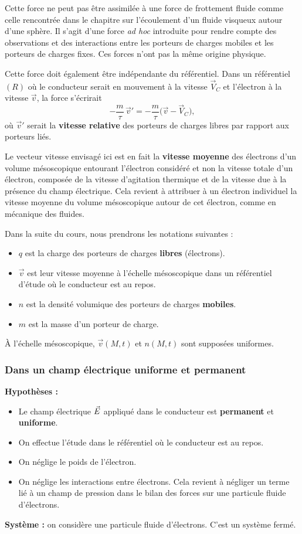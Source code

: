 \documentclass[11pt,a4paper]{article}
\newcommand{\vv}{\vec v}
\begin{document}
Cette force ne peut pas être assimilée à une force de frottement fluide comme celle rencontrée
dans le chapitre sur l'écoulement d'un fluide visqueux autour d'une sphère. Il s'agit d'une
force \emph{ad hoc} introduite pour rendre compte des observations et des interactions entre
les porteurs de charges mobiles et les porteurs de charges fixes. Ces forces n'ont pas la même
origine physique.

Cette force doit également être indépendante du référentiel. Dans un référentiel \((R)\) où le
conducteur serait en mouvement à la vitesse \(\vec V_C\) et l'électron à la vitesse \(\vv\),
la force s'écrirait
\[
 -\frac{m}{\tau}\,\vv'=-\frac{m}{\tau}\bigl(\vv-\vec V_C\bigr),
\]
où \(\vv'\) serait la \textbf{vitesse relative} des porteurs de charges libres par rapport aux porteurs liés.

Le vecteur vitesse envisagé ici est en fait la \textbf{vitesse moyenne} des électrons d'un volume
mésoscopique entourant l'électron considéré et non la vitesse totale d'un électron, composée de la
vitesse d'agitation thermique et de la vitesse due à la présence du champ électrique. Cela revient
à attribuer à un électron individuel la vitesse moyenne du volume mésoscopique autour de cet
électron, comme en mécanique des fluides.

Dans la suite du cours, nous prendrons les notations suivantes :
\begin{itemize}
\item \(q\) est la charge des porteurs de charges \textbf{libres} (électrons).
\item \(\vv\) est leur vitesse moyenne à l'échelle mésoscopique dans un référentiel d'étude
où le conducteur est au repos.
\item \(n\) est la densité volumique des porteurs de charges \textbf{mobiles}.
\item \(m\) est la masse d'un porteur de charge.
\end{itemize}
À l'échelle mésoscopique, \(\vv(M,t)\) et \(n(M,t)\) sont supposées uniformes.

\subsubsection{Dans un champ électrique uniforme et permanent}\label{sec:uniforme}
\textbf{Hypothèses :}
\begin{itemize}
\item Le champ électrique \(\vec E\) appliqué dans le conducteur est \textbf{permanent} et \textbf{uniforme}.
\item On effectue l'étude dans le référentiel où le conducteur est au repos.
\item On néglige le poids de l'électron.
\item On néglige les interactions entre électrons. Cela revient à négliger un terme lié à un
champ de pression dans le bilan des forces sur une particule fluide d'électrons.
\end{itemize}
\textbf{Système :} on considère une particule fluide d'électrons. C'est un système fermé.
\end{document}
